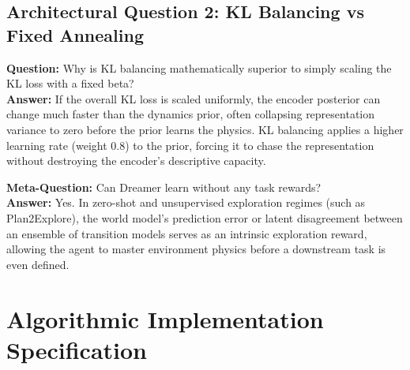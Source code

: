 \documentclass[11pt,a4paper]{article}
\theoremstyle{definition}
\begin{document}
\subsection{Architectural Question 2: KL Balancing vs Fixed Annealing}
\textbf{Question:} Why is KL balancing mathematically superior to simply scaling the KL loss with a fixed beta?\\
\textbf{Answer:} If the overall KL loss is scaled uniformly, the encoder posterior can change much faster than the dynamics prior, often collapsing representation variance to zero before the prior learns the physics. KL balancing applies a higher learning rate (weight $0.8$) to the prior, forcing it to chase the representation without destroying the encoder's descriptive capacity.

\textbf{Meta-Question:} Can Dreamer learn without any task rewards?\\
\textbf{Answer:} Yes. In zero-shot and unsupervised exploration regimes (such as Plan2Explore), the world model's prediction error or latent disagreement between an ensemble of transition models serves as an intrinsic exploration reward, allowing the agent to master environment physics before a downstream task is even defined.

\section{Algorithmic Implementation Specification}
\end{document}
